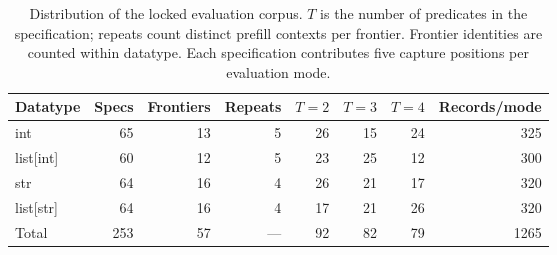 \begin{table}[ht]\centering\small
\begin{tabular}{lrrrrrrr}\toprule
Datatype & Specs & Frontiers & Repeats & $T=2$ & $T=3$ & $T=4$ & Records/mode\\\midrule
int & 65 & 13 & 5 & 26 & 15 & 24 & 325 \\
list[int] & 60 & 12 & 5 & 23 & 25 & 12 & 300 \\
str & 64 & 16 & 4 & 26 & 21 & 17 & 320 \\
list[str] & 64 & 16 & 4 & 17 & 21 & 26 & 320 \\
\midrule Total & 253 & 57 & --- & 92 & 82 & 79 & 1265\\\bottomrule
\end{tabular}
\caption{Distribution of the locked evaluation corpus. $T$ is the number of predicates in the specification; repeats count distinct prefill contexts per frontier. Frontier identities are counted within datatype. Each specification contributes five capture positions per evaluation mode.}
\label{tab:data-distribution}
\end{table}



